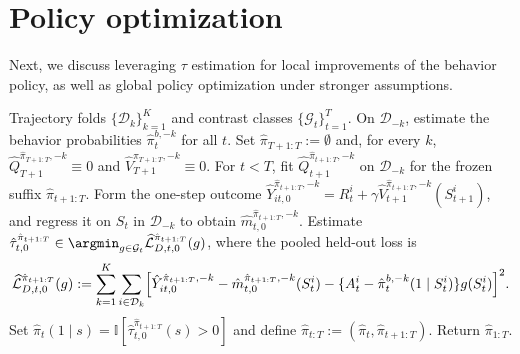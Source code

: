 \documentclass[opre,nonblindrev]{informs4}
\let\arxivSavedArgmin\argmin
\let\argmin\undefined
\let\argmin\arxivSavedArgmin
\providecommand{\cD}{\mathcal D}
\providecommand{\cG}{\mathcal G}
\providecommand{\hatunderpi}[1]{\hat{\pi}_{#1:T}}
\newcommand{\blipadv}{\tau}
\begin{document}
\section{Policy optimization}\label{sec-policy-opt}
Next, we discuss leveraging $\blipadv$ estimation for local improvements of the behavior policy, as well as global policy optimization under stronger assumptions. 


\begin{algorithm*}[t!]
\caption{Cross-fitted backward-greedy Difference-of-$Q$ optimization
($L=0$)}\label{alg-dyn-blipadv-optimization}
\begingroup
\makeatletter
{}
\makeatother
\begin{algorithmic}[1]
\REQUIRE Trajectory folds $\{\cD_k\}_{k=1}^K$ and contrast classes
$\{\cG_t\}_{t=1}^T$.
\STATE On $\cD_{-k}$, estimate the behavior probabilities
$\hat\pi_t^{b,-k}$ for all $t$.
\ENDFOR
\STATE Set $\hatunderpi{T+1}:=\emptyset$ and, for every $k$,
$\hat Q_{T+1}^{\hatunderpi{T+1},-k}\equiv0$ and
$\hat V_{T+1}^{\hatunderpi{T+1},-k}\equiv0$.
\STATE For $t<T$, fit
$\hat Q_{t+1}^{\hatunderpi{t+1},-k}$ on $\cD_{-k}$ for the frozen suffix
$\hatunderpi{t+1}.$
\STATE Form the one-step outcome
$\hat Y_{it,0}^{\hatunderpi{t+1},-k}
=R_t^i
+\gamma
\hat V_{t+1}^{\hatunderpi{t+1},-k}(S_{t+1}^i)$,
and regress it on $S_t$ in $\cD_{-k}$ to obtain
$\hat m_{t,0}^{\hatunderpi{t+1},-k}$.
\ENDFOR
\STATE Estimate $\hat\blipadv_{t,0}^{\hatunderpi{t+1}}\in \argmin_{g\in\cG_t}
\widehat{\mathcal L}_{D,t,0}^{\hatunderpi{t+1}}(g)$, where the pooled
held-out loss is
\begin{equation*}
\widehat{\mathcal L}_{D,t,0}^{\hatunderpi{t+1}}(g)
:=
\sum_{k=1}^K\sum_{i\in\cD_k}
\Bigl[
\hat Y_{it,0}^{\hatunderpi{t+1},-k}
-\hat m_{t,0}^{\hatunderpi{t+1},-k}(S_t^i)
-\{A_t^i-\hat\pi_t^{b,-k}(1\mid S_t^i)\}g(S_t^i)
\Bigr]^2.
\end{equation*}
\STATE Set
$\hat\pi_t(1\mid s)
=\mathbb I[\hat\blipadv_{t,0}^{\hatunderpi{t+1}}(s)>0]$
and define $\hat\pi_{t:T}:=(\hat\pi_t,\hatunderpi{t+1})$.
\ENDFOR
\STATE Return $\hat\pi_{1:T}$.
\end{algorithmic}
\endgroup
\end{algorithm*}
\end{document}
